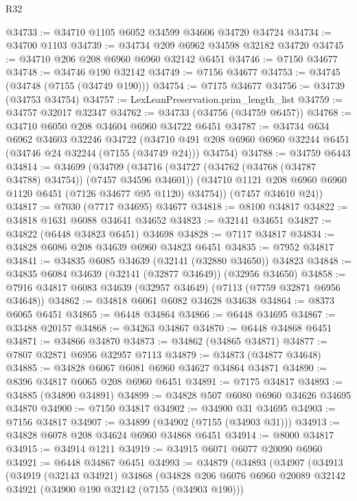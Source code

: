 \begin{lexlean}{R32}
\begin{coremodule}
@34733 := @34710 @1105 @6052 @34599 @34606 @34720 @34724
@34734 := @34700 @1103
@34739 := @34734 @209 @6962 @34598 @32182 @34720
@34745 := @34710 @206 @208 @6960 @6960 @32142 @6451
@34746 := @7150 @34677
@34748 := @34746 @190 @32142
@34749 := @7156 @34677
@34753 := @34745 (@34748 (@7155 (@34749 @190)))
@34754 := @7175 @34677
@34756 := @34739 (@34753 @34754)
@34757 := LexLeanPreservation.prim_length_list
@34759 := @34757 @32017 @32347
@34762 := @34733 (@34756 (@34759 @6457))
@34768 := @34710 @6050 @208 @34604 @6960 @34722 @6451
@34787 := @34734
    @634
    @6962
    @34603
    @32246
    @34722
    (@34710 @491 @208 @6960 @6960 @32244 @6451 (@34746 @24 @32244 (@7155 (@34749 @24))) @34754)
@34788 := @34759 @6443
@34814 := @34699
    (@34709
      (@34716
        (@34727 (@34762 (@34768 (@34787 @34788) @34754)) (@7457 @34596 @34601))
        (@34710 @1121 @208 @6960 @6960 @1120 @6451 (@7126 @34677 @95 @1120) @34754))
      (@7457 @34610 @24))
@34817 := @7030 (@7717 @34695) @34677
@34818 := @8100 @34817
@34822 := @34818 @1631 @6088 @34641 @34652
@34823 := @32141 @34651
@34827 := @34822 (@6448 @34823 @6451) @34698
@34828 := @7117 @34817
@34834 := @34828 @6086 @208 @34639 @6960 @34823 @6451
@34835 := @7952 @34817
@34841 := @34835 @6085 @34639 (@32141 (@32880 @34650)) @34823
@34848 := @34835 @6084 @34639 (@32141 (@32877 @34649)) (@32956 @34650)
@34858 := @7916 @34817 @6083 @34639 (@32957 @34649) (@7113 (@7759 @32871 @6956 @34648))
@34862 := @34818 @6061 @6082 @34628 @34638
@34864 := @8373 @6065 @6451
@34865 := @6448 @34864
@34866 := @6448 @34695
@34867 := @33488 @20157
@34868 := @34263 @34867
@34870 := @6448 @34868 @6451
@34871 := @34866 @34870
@34873 := @34862 (@34865 @34871)
@34877 := @7807 @32871 @6956 @32957 @7113
@34879 := @34873 (@34877 @34648)
@34885 := @34828 @6067 @6081 @6960 @34627 @34864 @34871
@34890 := @8396 @34817 @6065 @208 @6960 @6451
@34891 := @7175 @34817
@34893 := @34885 (@34890 @34891)
@34899 := @34828 @507 @6080 @6960 @34626 @34695 @34870
@34900 := @7150 @34817
@34902 := @34900 @31 @34695
@34903 := @7156 @34817
@34907 := @34899 (@34902 (@7155 (@34903 @31)))
@34913 := @34828 @6078 @208 @34624 @6960 @34868 @6451
@34914 := @8000 @34817
@34915 := @34914 @1211
@34919 := @34915 @6071 @6077 @20090 @6960
@34921 := @6448 @34867 @6451
@34993 := @34879
    (@34893
      (@34907
        (@34913
          (@34919
            (@32143 @34921)
            @34868
            (@34828
              @206
              @6076
              @6960
              @20089
              @32142
              @34921
              (@34900 @190 @32142 (@7155 (@34903 @190)))

\end{coremodule}
\end{lexlean}
